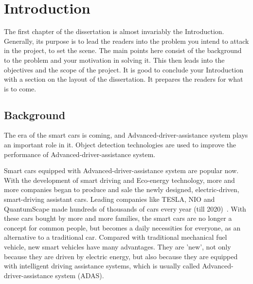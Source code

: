 
\chapter{Introduction}
\begin{spacing}{1.5}
\setlength{\parskip}{0.3in}

The first chapter of the dissertation is almost invariably the Introduction. Generally, its purpose is to lead the readers into the problem you intend to attack in the project, to set the scene. The main points here consist of the background to the problem and your motivation in solving it. This then leads into the objectives and the scope of the project. It is good to conclude your Introduction with a section on the layout of the dissertation. It prepares the readers for what is to come.

\section{Background}

The era of the smart cars is coming, and Advanced-driver-assistance system plays an important role in it. Object detection technologies are used to improve the performance of Advanced-driver-assistance system.

Smart cars equipped with Advanced-driver-assistance system are popular now. With the development of smart driving and Eco-energy technology, more and more companies began to produce and sale the newly designed, electric-driven, smart-driving assistant cars. Leading companies like TESLA, NIO and QuantumScape made hundreds of thousands of cars every year (till 2020)~\cite{petranek2015we}. With these cars bought by more and more families, the smart cars are no longer a concept for common people, but becomes a daily necessities for everyone, as an alternative to a traditional car. Compared with traditional mechanical fuel vehicle, new smart vehicles have many advantages. They are 'new', not only because they are driven by electric energy, but also because they are equipped with intelligent driving assistance systems, which is usually called Advanced-driver-assistance system (ADAS).


\end{spacing}

